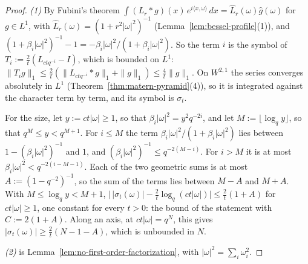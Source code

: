 \begin{proof}
\emph{(1)} By Fubini's theorem $\int (L_r * g)(x)\,e^{i\langle x,\omega\rangle}\,dx =
\widehat L_r(\omega)\widehat g(\omega)$ for $g \in L^1$, with $\widehat L_r(\omega) = (1 + r^2|\omega|^2)^{-1}$
(Lemma~\ref{lem:bessel-profile}(1)),
and $(1 + \beta_i|\omega|^2)^{-1} - 1 = -\beta_i|\omega|^2/(1 + \beta_i|\omega|^2)$. So the term
$i$ is the symbol of $T_i := \frac2t(L_{ctq^{-i}} - I)$, which is bounded on $L^1$:
$\|T_ig\|_1 \le \frac2t(\|L_{ctq^{-i}} * g\|_1 + \|g\|_1) \le \frac4t\|g\|_1$. On $W^{2,1}$ the series converges
absolutely in $L^1$ (Theorem~\ref{thm:matern-pyramid}(4)), so it is integrated against the
character term by term, and its symbol is $\sigma_t$.

For the size, let $y := ct|\omega| \ge 1$, so that $\beta_i|\omega|^2 = y^2q^{-2i}$, and let
$M := \lfloor\log_q y\rfloor$, so that $q^M \le y < q^{M+1}$. For $i \le M$ the term
$\beta_i|\omega|^2/(1 + \beta_i|\omega|^2)$ lies between $1 - (\beta_i|\omega|^2)^{-1}$ and $1$,
and $(\beta_i|\omega|^2)^{-1} \le q^{-2(M-i)}$. For $i > M$ it is at most
$\beta_i|\omega|^2 < q^{-2(i-M-1)}$. Each of the two geometric sums is at most
$A := (1 - q^{-2})^{-1}$, so the sum of the terms lies between $M - A$ and $M + A$. With
$M \le \log_q y < M + 1$,
$\bigl|\,|\sigma_t(\omega)| - \frac2t\log_q(ct|\omega|)\bigr| \le \frac2t(1 + A)$
for $ct|\omega| \ge 1$, one constant for every $t > 0$: the bound of the statement with
$C := 2(1 + A)$. Along an axis, at $ct|\omega| = q^N$, this
gives $|\sigma_t(\omega)| \ge \frac2t(N - 1 - A)$, which is unbounded in $N$.

\emph{(2)} is Lemma~\ref{lem:no-first-order-factorization}, with $|\omega|^2 = \sum_i\omega_i^2$.


\end{proof}
